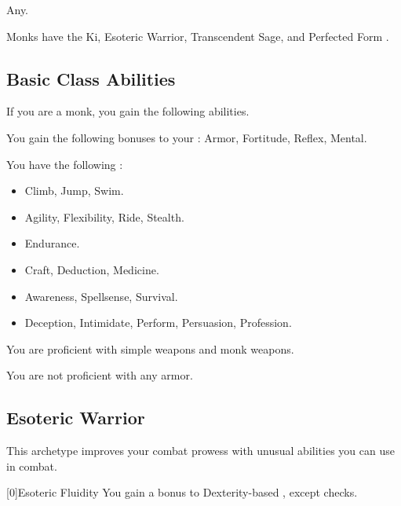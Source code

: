      Any.

     Monks have the Ki, Esoteric Warrior, Transcendent Sage, and Perfected Form .

    \subsection{Basic Class Abilities}
        If you are a monk, you gain the following abilities.

        You gain the following bonuses to your :  Armor,  Fortitude,  Reflex,  Mental.

        You have the following :
        \begin{itemize}
            \item {} Climb, Jump, Swim.
            \item {} Agility, Flexibility, Ride, Stealth.
            \item {} Endurance.
            \item {} Craft, Deduction, Medicine.
            \item {} Awareness, Spellsense, Survival.
            \item {} Deception, Intimidate, Perform, Persuasion, Profession.
        \end{itemize}

        You are proficient with simple weapons and monk weapons.

        You are not proficient with any armor.

    \newpage
    \subsection{Esoteric Warrior}\label{Esoteric Warrior}
        This archetype improves your combat prowess with unusual abilities you can use in combat.

        [0]{Esoteric Fluidity} You gain a  bonus to Dexterity-based , except  checks.

